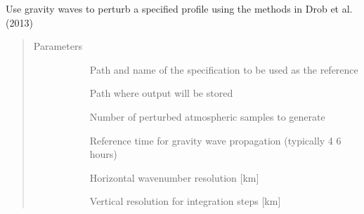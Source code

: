 \documentclass[letterpaper,10pt,english]{sphinxmanual}
\begin{document}
\begin{fulllineitems}
\label{\detokenize{stochprop.gravity:stochprop.gravity_waves.perturb_atmo}}
\sphinxAtStartPar
Use gravity waves to perturb a specified profile using the methods in Drob et al. (2013)
\begin{quote}\begin{description}
\item[{Parameters}] \leavevmode\begin{description}
\item[{}] \leavevmode
\sphinxAtStartPar
Path and name of the specification to be used as the reference

\item[{}] \leavevmode
\sphinxAtStartPar
Path where output will be stored

\item[{}] \leavevmode
\sphinxAtStartPar
Number of perturbed atmospheric samples to generate

\item[{}] \leavevmode
\sphinxAtStartPar
Reference time for gravity wave propagation (typically 4 \sphinxhyphen{} 6 hours)

\item[{}] \leavevmode
\sphinxAtStartPar
Horizontal wavenumber resolution {[}km{]}

\item[{}] \leavevmode
\sphinxAtStartPar
Vertical resolution for integration steps {[}km{]}


\end{description}
\end{description}
\end{quote}
\end{fulllineitems}
\end{document}
